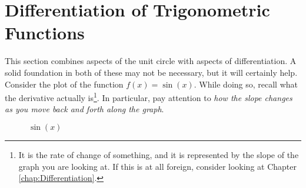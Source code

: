 \chapter{Differentiation of Trigonometric Functions}
\label{chap:DifferentiationOfTrigFunctions}
This section combines aspects of the unit circle with aspects of
differentiation. A solid foundation in both of these may not be necessary, but
it will certainly help. Consider the plot of the function $f(x) = \sin(x)$.
While doing so, recall what the derivative actually is\footnote{It is the rate
of change of something, and it is represented by the slope of the graph you are
looking at. If this is at all foreign, consider looking at Chapter
\ref{chap:Differentiation}.}. In particular, pay attention to \emph{how the
slope changes as you move back and forth along the graph}. 
\begin{figure}[!htb]
\label{fig:GraphTemplate}
\caption{$\sin(x)$}
\end{figure}
 
